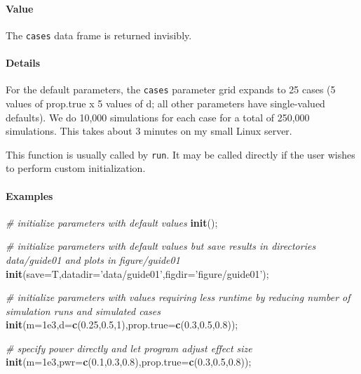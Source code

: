 \documentclass[]{article}
\newenvironment{Shaded}{\begin{snugshade}}{\end{snugshade}}
\newcommand{\KeywordTok}[1]{\textcolor[rgb]{0.13,0.29,0.53}{\textbf{{#1}}}}
\newcommand{\DataTypeTok}[1]{\textcolor[rgb]{0.13,0.29,0.53}{{#1}}}
\newcommand{\DecValTok}[1]{\textcolor[rgb]{0.00,0.00,0.81}{{#1}}}
\newcommand{\FloatTok}[1]{\textcolor[rgb]{0.00,0.00,0.81}{{#1}}}
\newcommand{\StringTok}[1]{\textcolor[rgb]{0.31,0.60,0.02}{{#1}}}
\newcommand{\CommentTok}[1]{\textcolor[rgb]{0.56,0.35,0.01}{\textit{{#1}}}}
\newcommand{\NormalTok}[1]{{#1}}
\let\oldparagraph\paragraph
\renewcommand{\paragraph}[1]{\oldparagraph{#1}\mbox{}}
\begin{document}
\endgroup

\paragraph{Value}\label{value-1}

The \texttt{cases} data frame is returned invisibly.

\paragraph{Details}\label{details}

For the default parameters, the \texttt{cases} parameter grid expands to
25 cases (5 values of prop.true x 5 values of d; all other parameters
have single-valued defaults). We do 10,000 simulations for each case for
a total of 250,000 simulations. This takes about 3 minutes on my small
Linux server.

This function is usually called by \texttt{run}. It may be called
directly if the user wishes to perform custom initialization.

\paragraph{Examples}\label{examples-1}

\begin{Shaded}
\begin{Highlighting}[]
\CommentTok{# initialize parameters with default values}
\KeywordTok{init}\NormalTok{();}

\CommentTok{# initialize parameters with default values but save results in directories data/guide01 and plots in figure/guide01}
\KeywordTok{init}\NormalTok{(}\DataTypeTok{save=}\NormalTok{T,}\DataTypeTok{datadir=}\StringTok{'data/guide01'}\NormalTok{,}\DataTypeTok{figdir=}\StringTok{'figure/guide01'}\NormalTok{);}

\CommentTok{# initialize parameters with values requiring less runtime by reducing number of simulation runs and simulated cases}
\KeywordTok{init}\NormalTok{(}\DataTypeTok{m=}\FloatTok{1e3}\NormalTok{,}\DataTypeTok{d=}\KeywordTok{c}\NormalTok{(}\FloatTok{0.25}\NormalTok{,}\FloatTok{0.5}\NormalTok{,}\DecValTok{1}\NormalTok{),}\DataTypeTok{prop.true=}\KeywordTok{c}\NormalTok{(}\FloatTok{0.3}\NormalTok{,}\FloatTok{0.5}\NormalTok{,}\FloatTok{0.8}\NormalTok{));}

\CommentTok{# specify power directly and let program adjust effect size}
\KeywordTok{init}\NormalTok{(}\DataTypeTok{m=}\FloatTok{1e3}\NormalTok{,}\DataTypeTok{pwr=}\KeywordTok{c}\NormalTok{(}\FloatTok{0.1}\NormalTok{,}\FloatTok{0.3}\NormalTok{,}\FloatTok{0.8}\NormalTok{),}\DataTypeTok{prop.true=}\KeywordTok{c}\NormalTok{(}\FloatTok{0.3}\NormalTok{,}\FloatTok{0.5}\NormalTok{,}\FloatTok{0.8}\NormalTok{));}
\end{Highlighting}
\end{Shaded}
\end{document}
